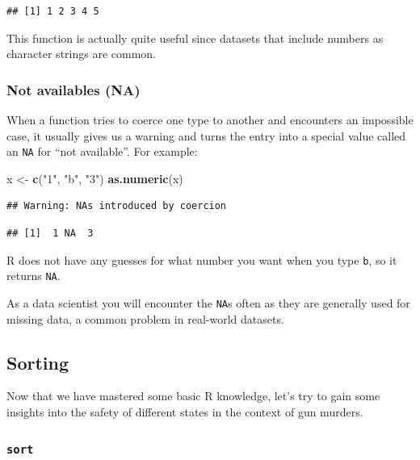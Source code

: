 \documentclass[
]{article}
\newenvironment{Shaded}{\begin{snugshade}}{\end{snugshade}}
\newcommand{\FunctionTok}[1]{\textcolor[rgb]{0.13,0.29,0.53}{\textbf{#1}}}
\newcommand{\NormalTok}[1]{#1}
\newcommand{\OtherTok}[1]{\textcolor[rgb]{0.56,0.35,0.01}{#1}}
\newcommand{\StringTok}[1]{\textcolor[rgb]{0.31,0.60,0.02}{#1}}
\begin{document}
\begin{verbatim}
## [1] 1 2 3 4 5
\end{verbatim}

This function is actually quite useful since datasets that include
numbers as character strings are common.

\subsubsection{Not availables (NA)}\label{not-availables-na}

When a function tries to coerce one type to another and encounters an
impossible case, it usually gives us a warning and turns the entry into
a special value called an \texttt{NA} for ``not available''. For
example:

\begin{Shaded}
\begin{Highlighting}[]
\NormalTok{x }\OtherTok{\textless{}{-}} \FunctionTok{c}\NormalTok{(}\StringTok{"1"}\NormalTok{, }\StringTok{"b"}\NormalTok{, }\StringTok{"3"}\NormalTok{)}
\FunctionTok{as.numeric}\NormalTok{(x)}
\end{Highlighting}
\end{Shaded}

\begin{verbatim}
## Warning: NAs introduced by coercion
\end{verbatim}

\begin{verbatim}
## [1]  1 NA  3
\end{verbatim}

R does not have any guesses for what number you want when you type
\texttt{b}, so it returns \texttt{NA}.

As a data scientist you will encounter the \texttt{NA}s often as they
are generally used for missing data, a common problem in real-world
datasets.

\subsection{Sorting}\label{sorting}

Now that we have mastered some basic R knowledge, let's try to gain some
insights into the safety of different states in the context of gun
murders.

\subsubsection{\texorpdfstring{\texttt{sort}}{sort}}\label{sort}
\end{document}
